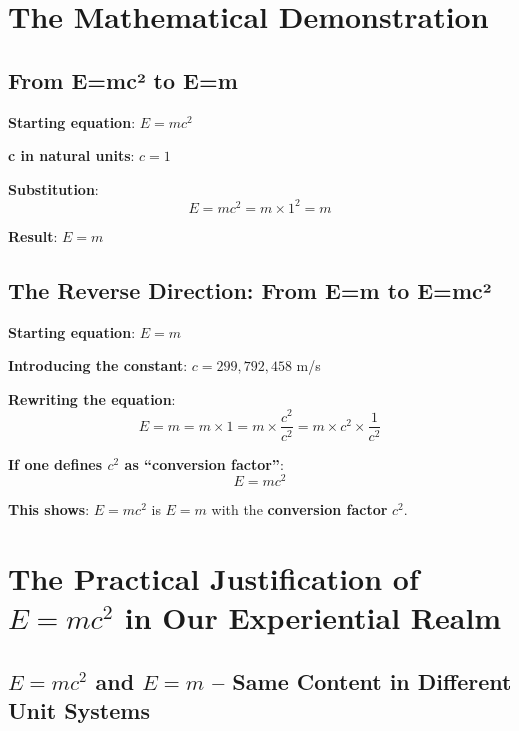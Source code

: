 	\section{The Mathematical Demonstration}
	
	\subsection{From E=mc² to E=m}
	
	\textbf{Starting equation}: $E = mc^2$
	
	\textbf{c in natural units}: $c = 1$
	
	\textbf{Substitution}:
	\begin{equation}
		E = mc^2 = m \times 1^2 = m
	\end{equation}
	
	\textbf{Result}: $E = m$
	
	\subsection{The Reverse Direction: From E=m to E=mc²}
	
	\textbf{Starting equation}: $E = m$
	
	\textbf{Introducing the constant}: $c = 299,792,458$ m/s
	
	\textbf{Rewriting the equation}:
	\begin{equation}
		E = m = m \times 1 = m \times \frac{c^2}{c^2} = m \times c^2 \times \frac{1}{c^2}
	\end{equation}
	
	\textbf{If one defines $c^2$ as ``conversion factor''}:
	\begin{equation}
		E = mc^2
	\end{equation}
	
	\textbf{This shows}: $E = mc^2$ is $E = m$ with the \textbf{conversion factor} $c^2$.
	
	\section{The Practical Justification of \( E = mc^2 \) in Our Experiential Realm}
	
	\subsection{\( E = mc^2 \) and \( E = m \) – Same Content in Different Unit Systems}
	
